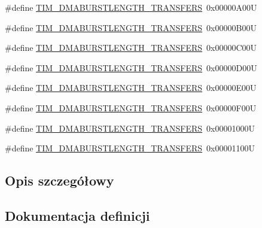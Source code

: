 \begin{DoxyCompactItemize}
\item 
\#define \hyperlink{group___t_i_m___d_m_a___burst___length_ga79ab58b6a3b30c54c0758b381df22cb0}{T\+I\+M\+\_\+\+D\+M\+A\+B\+U\+R\+S\+T\+L\+E\+N\+G\+T\+H\+\_\+T\+R\+A\+N\+S\+F\+E\+RS}~0x00000\+A00U
\item 
\#define \hyperlink{group___t_i_m___d_m_a___burst___length_gaf52962b501b3a76d89df6274ed425947}{T\+I\+M\+\_\+\+D\+M\+A\+B\+U\+R\+S\+T\+L\+E\+N\+G\+T\+H\+\_\+T\+R\+A\+N\+S\+F\+E\+RS}~0x00000\+B00U
\item 
\#define \hyperlink{group___t_i_m___d_m_a___burst___length_ga06a81eba628bea6495d86ebcc6021da0}{T\+I\+M\+\_\+\+D\+M\+A\+B\+U\+R\+S\+T\+L\+E\+N\+G\+T\+H\+\_\+T\+R\+A\+N\+S\+F\+E\+RS}~0x00000\+C00U
\item 
\#define \hyperlink{group___t_i_m___d_m_a___burst___length_ga5f430b76c0aeded0a8d8be779f26ae52}{T\+I\+M\+\_\+\+D\+M\+A\+B\+U\+R\+S\+T\+L\+E\+N\+G\+T\+H\+\_\+T\+R\+A\+N\+S\+F\+E\+RS}~0x00000\+D00U
\item 
\#define \hyperlink{group___t_i_m___d_m_a___burst___length_ga98a4d88c533178bc1b4347e4c5ce815a}{T\+I\+M\+\_\+\+D\+M\+A\+B\+U\+R\+S\+T\+L\+E\+N\+G\+T\+H\+\_\+T\+R\+A\+N\+S\+F\+E\+RS}~0x00000\+E00U
\item 
\#define \hyperlink{group___t_i_m___d_m_a___burst___length_gaf4b2a1fe12c52272544c21e17de1ed90}{T\+I\+M\+\_\+\+D\+M\+A\+B\+U\+R\+S\+T\+L\+E\+N\+G\+T\+H\+\_\+T\+R\+A\+N\+S\+F\+E\+RS}~0x00000\+F00U
\item 
\#define \hyperlink{group___t_i_m___d_m_a___burst___length_gad31c1fca7ed436a53efc4f290144584d}{T\+I\+M\+\_\+\+D\+M\+A\+B\+U\+R\+S\+T\+L\+E\+N\+G\+T\+H\+\_\+T\+R\+A\+N\+S\+F\+E\+RS}~0x00001000U
\item 
\#define \hyperlink{group___t_i_m___d_m_a___burst___length_gabb6f72b02ee1c8855de241cb0713e2ca}{T\+I\+M\+\_\+\+D\+M\+A\+B\+U\+R\+S\+T\+L\+E\+N\+G\+T\+H\+\_\+T\+R\+A\+N\+S\+F\+E\+RS}~0x00001100U
\end{DoxyCompactItemize}


\subsection{Opis szczegółowy}


\subsection{Dokumentacja definicji}
\mbox{\label{group___t_i_m___d_m_a___burst___length_ga793a89bb8a0669e274de451985186c53}} 
